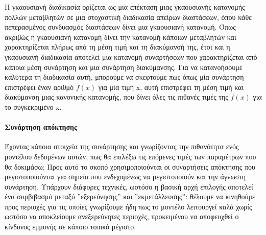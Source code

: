 \documentclass{article}
\begin{document}
Η γκαουσιανή διαδικασία ορίζεται ως μια επέκταση μιας γκαουσιανής κατανομής πολλών μεταβλητών σε μια στοχαστική διαδικασία απείρων διαστάσεων, όπου κάθε πεπερασμένος συνδυασμός διαστάσεων δίνει μια γκαουσιανή κατανομή. Όπως ακριβώς η γκαουσιανή κατανομή δίνει την κατανομή κάποιων μεταβλητών και χαρακτηρίζεται πλήρως από τη μέση τιμή και τη διακύμανσή της, έτσι και η γκαουσιανή διαδικασία αποτελεί μια κατανομή συναρτήσεων που χαρακτηρίζεται από κάποια μέση
συνάρτηση και μια συνάρτηση διακύμανσης. Για να κατανοήσουμε καλύτερα τη διαδικασία αυτή, μπορούμε να σκεφτούμε πως όπως μία συνάρτηση επιστρέφει έναν αριθμό $f(x)$ για μία τιμή x, αυτή επιστρέφει τη μέση τιμή και διακύμανση μιας κανονικής κατανομής, που δίνει όλες τις πιθανές τιμές της $f(x)$ για το συγκεκριμένο x.
\paragraph{Συνάρτηση απόκτησης} Έχοντας κάποια στοιχεία της συνάρτησης και γνωρίζοντας την πιθανότητα ενός μοντέλου δεδομένων αυτών, πως θα επιλέξω τις επόμενες τιμές των παραμέτρων που θα δοκιμάσω; Προς αυτό το σκοπό χρησιμοποιούνται οι συναρτήσεις απόκτησης που μεγιστοποιούνται για σημεία που
ενδεχομένως να μεγιστοποιούν και την άγνωστη συνάρτηση. Υπάρχουν διάφορες τεχνικές, ωστόσο η βασική αρχή επιλογής αποτελεί ένα συμβιβασμό μεταξύ ''εξερεύνησης'' και ''εκμετάλλευσης'': θέλουμε να κινηθούμε προς περιοχές για τις οποίες γνωρίζουμε ήδη πως το μοντέλο λειτουργεί καλά χωρίς ωστόσο να αποκλείουμε ανεξερεύνητες περιοχές, προκειμένου να αποφευχθεί ο κίνδυνος εμμονής σε κάποιο τοπικό μέγιστο.
\end{document}
